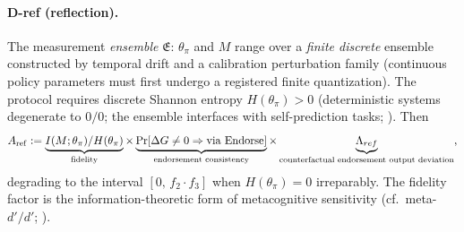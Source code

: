 \paragraph{D-ref (reflection).} The measurement \emph{ensemble}
$\mathfrak{E}$: $\theta_\pi$ and $M$ range over a \emph{finite discrete}
ensemble constructed by temporal drift and a calibration perturbation family
(continuous policy parameters must first undergo a registered finite
quantization). The protocol requires discrete Shannon entropy
$H(\theta_\pi)>0$ (deterministic systems degenerate to $0/0$; the ensemble
interfaces with self-prediction tasks; \citealp{binder2024}). Then
\begin{equation}\label{eq:aref}
A_{\mathrm{ref}} := \underbrace{I(M;\theta_\pi)/H(\theta_\pi)}_{\text{fidelity}}
\times \underbrace{\Pr[\Delta G\neq0\Rightarrow\text{via }\mathrm{Endorse}]}_{\text{endorsement consistency}}
\times \underbrace{\Lambda_{ref}}_{\text{counterfactual endorsement output deviation}},
\end{equation}
degrading to the interval $[0,\,f_2\cdot f_3]$ when $H(\theta_\pi)=0$
irreparably. The fidelity factor is the information-theoretic form of
metacognitive sensitivity (cf.\ meta-$d'/d'$; \citealp{fleming_lau2014}).


